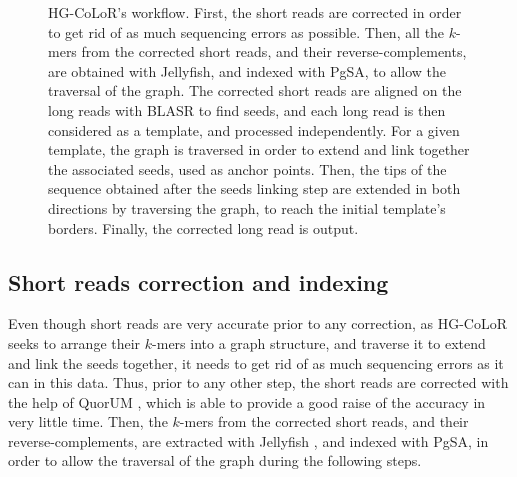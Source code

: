 \documentclass[long, final]{jobim2017}
\begin{document}
\begin{figure}
	\begin{center}
	\end{center}
	\caption{HG-CoLoR's workflow. First, the short reads are corrected in order to get rid of as much sequencing errors as possible. Then,
	all the $k$-mers from the corrected short reads, and their reverse-complements, are obtained with Jellyfish, and indexed with PgSA, to
	allow the traversal of the graph.
	The corrected short reads are aligned on the long reads with BLASR to find seeds, and each long read is then considered as a template, and
	processed independently. For a given template, the graph is traversed in order to extend and link together the associated seeds, used as
	anchor points. Then, the tips of the sequence obtained after the seeds linking step are extended in both directions by traversing the graph,
	to reach the initial template's borders. Finally, the corrected long read is output. \label{OMWorkflow}}
\end{figure}

\subsection{Short reads correction and indexing}

Even though short reads are very accurate prior to any correction, as HG-CoLoR seeks to arrange their $k$-mers into a graph structure, and traverse it to extend and link the seeds together, it needs to get rid of as much sequencing errors as it can in this data. Thus, prior to any other step, the short reads are corrected with the help of QuorUM \cite{Marcais2015}, which is able to provide a good raise of the accuracy in very little time. Then, the $k$-mers from the corrected short reads, and their reverse-complements, are extracted with Jellyfish \cite{Marcais2011}, and indexed with PgSA, in order to allow the traversal
of the graph during the following steps.
\end{document}
